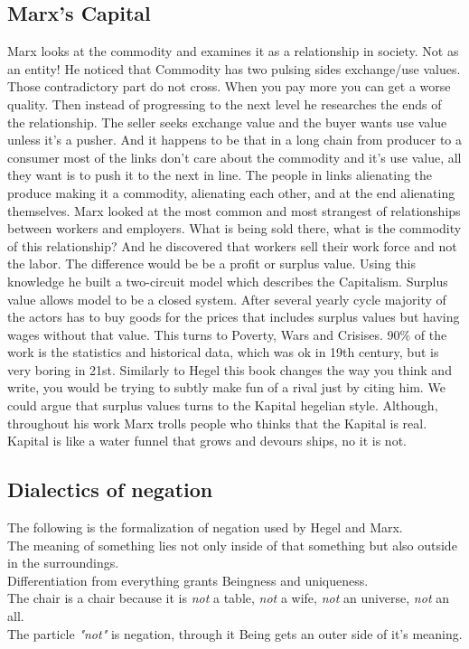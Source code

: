 \documentclass[12pt, a4paper, twocolumn]{article}
\begin{document}
\begin{appendices}
\subsection{Marx's Capital}
Marx looks at the commodity and examines it as a relationship in society. Not as an entity! He noticed that Commodity has two pulsing sides exchange/use values. Those contradictory part do not cross. When you pay more you can get a worse quality.
Then instead of progressing to the next level he researches the ends of the relationship. The seller seeks exchange value and the buyer wants use value unless it's a pusher. And it happens to be that in a long chain from producer to a consumer most of the links don't care about the commodity and it's use value, all they want is to push it to the next in line. The people in links alienating the produce making it a commodity, alienating each other, and at the end alienating themselves.
Marx looked at the most common and most strangest of relationships between workers and employers. What is being sold there, what is the commodity of this relationship?
And he discovered that workers sell their work force and not the labor. The difference would be be a profit or surplus value.
Using this knowledge he built a two-circuit model which describes the Capitalism. Surplus value allows model to be a closed system. After several yearly cycle majority of the actors has to buy goods for the prices that includes surplus values but having wages without that value. This turns to Poverty, Wars and Crisises.
90\% of the work is the statistics and historical data, which was ok in 19th century, but is very boring in 21st.
Similarly to Hegel this book changes the way you think and write, you would be trying to subtly make fun of a rival just by citing him.
We could argue that surplus values turns to the Kapital hegelian style. Although, throughout his work Marx trolls people who thinks that the Kapital is real. Kapital is like a water funnel that grows and devours ships, no it is not. 

\subsection{Dialectics of negation}
The following is the formalization of negation used by Hegel and Marx.
\\ The meaning of something lies not only inside of that something but also outside in the surroundings.
\\ Differentiation from everything grants Beingness and uniqueness.
\\ The chair is a chair because it is \textit{not} a table, \textit{not} a wife, \textit{not} an universe, \textit{not} an all.
\\ The particle \textit{"not"} is negation, through it Being gets an outer side of it's meaning.


\end{appendices}
\end{document}
